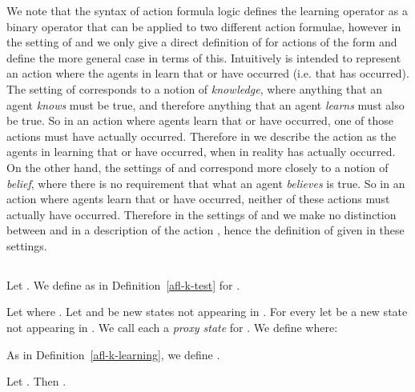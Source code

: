 \documentclass[twoside]{aiml14}
\begin{document}
  We note that the syntax of action formula logic defines the learning operator
  as a binary operator that can be applied to two different action formulae,
  however in the setting of \classK{} and \classKFF{} we only give a direct
  definition of  for actions of the form 
  and define the more general case in terms of this. Intuitively 
   is intended to represent an action where
  the agents in  learn that  or  have occurred (i.e.
  that  has occurred). The setting of \classS{}
  corresponds to a notion of {\em knowledge}, where anything that an agent {\em
  knows} must be true, and therefore anything that an agent {\em learns} must
  also be true. So in an action where agents learn that  or 
  have occurred, one of those actions must have actually occurred. Therefore in
  \classS{} we describe the action  as the
  agents in  learning that  or  have occurred, when in
  reality  has actually occurred. On the other hand, the settings of
  \classK{} and \classKFF{} correspond more closely to a notion of {\em
  belief}, where there is no requirement that what an agent {\em believes} is
  true. So in an action where agents learn that  or  have
  occurred, neither of these actions must actually have occurred. Therefore in
  the settings of \classK{} and \classKFF{} we make no distinction between
   and  in a description of the action , hence the definition of  given in these settings.

  \subsection{\classKFF{}}

  \begin{definition}[Test]\label{afl-kff-test}
      Let . We define  as in
      Definition~\ref{afl-k-test} for \classK{}.
  \end{definition}

  \begin{definition}[Learning]\label{afl-kff-learning}
      Let  where 
      .
      Let  and  be new states not appearing in .
      For every  let  be a new state not appearing in . 
      We call each  a {\em proxy state} for .
      We define  where:
      

      As in Definition~\ref{afl-k-learning}, we define .
  \end{definition}

  \begin{lemma}\label{afl-kff-structure}
      Let . Then .
  \end{lemma}
\end{document}
